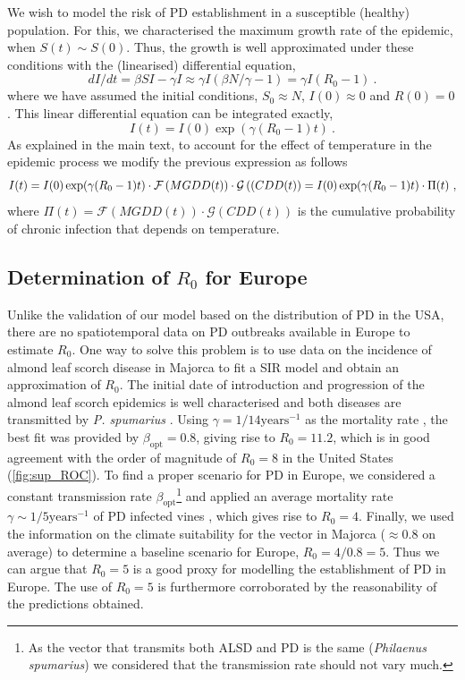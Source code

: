 We wish to model the risk of PD establishment in a susceptible (healthy)
population. For this, we characterised the maximum growth rate of the epidemic,
when $S(t)\sim S(0)$. Thus, the growth is well approximated under these
conditions with
the (linearised) differential equation,
\begin{equation}
    dI/dt=\beta SI-\gamma I\approx \gamma I(\beta N/\gamma - 1)=\gamma
    I(R_0-1) \ .
\end{equation}
where we have assumed the initial conditions,
$S_0\approx N$, $I(0)\approx0$ and $R(0)=0$. This linear differential
equation can be integrated exactly,
\begin{equation}\label{eq: infect_proc}
    I(t)=I(0)\exp(\gamma(R_0-1)t) \ .
\end{equation}
As explained in the main text, to account for the effect of temperature in
the epidemic process we modify the previous expression as follows
\begin{equation}\label{eq: final_eq}
    I(t)=I(0)\exp(\gamma(R_0-1)t)\cdot \mathcal{F}\left(MGDD(t)\right)\cdot
    \mathcal{G}\left((CDD(t)\right)= I(0)\exp(\gamma(R_0-1)t)\cdot\Pi(t) \ ,
\end{equation}
where $\Pi(t)=\mathcal{F}(MGDD(t))\cdot \mathcal{G}(CDD(t))$ is the
cumulative probability of chronic infection that depends on temperature.

\subsection{Determination of $R_0$ for Europe}\label{app:R0_Europe}

Unlike the validation of our model based on the distribution of PD in the
USA, there are no spatiotemporal data on PD outbreaks available in Europe to
estimate $R_0$. One way to solve this problem is to use data on the incidence
of almond leaf scorch disease in Majorca to fit a SIR model and obtain an
approximation of $R_0$. The initial date of introduction and progression of the
almond leaf scorch epidemics is well characterised and both diseases are
transmitted by \textit{P. spumarius} \cite{Moralejo2019,Moralejo2020}. Using
$\gamma=1/14 \textrm{years}^{-1}$ as the mortality rate \cite{Moralejo2020},
the best fit was provided by $\beta_{\textrm{opt}}=0.8$, giving rise to
$R_0=11.2$, which is in good agreement with the order of magnitude of $R_0=8$
in the United States (\cref{fig:sup_ROC}). To find a proper scenario for PD in
Europe, we considered a constant transmission rate
$\beta_{\textrm{opt}}$\footnote{As the vector that transmits both ALSD and PD
    is the same (\textit{Philaenus spumarius}) we considered that the
    transmission
    rate should not vary much.} and applied an average mortality rate
$\gamma\sim
    1/5 \textrm{years}^{-1}$ of PD infected vines \cite{Purcell2013}, which
gives
rise to $R_0=4$. Finally, we used the information on the climate suitability
for the vector in Majorca ($\approx0.8$ on average) to determine a baseline
scenario for Europe, $R_0=4/0.8=5$. Thus we can argue that $R_0=5$ is a good
proxy for modelling the establishment of PD in Europe. The use of $R_0=5$ is
furthermore corroborated by the reasonability of the predictions obtained.

